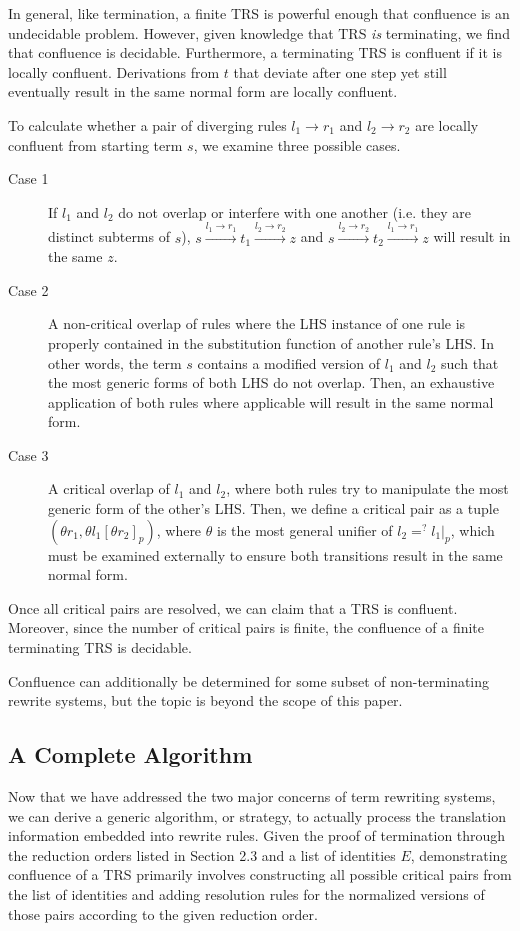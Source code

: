 \documentclass{article}
\begin{document}
In general, like termination, a finite TRS is powerful enough that confluence is an undecidable problem.
However, given knowledge that TRS \textit{is} terminating, we find that confluence is decidable.
Furthermore, a terminating TRS is confluent if it is locally confluent. Derivations from $t$
that deviate after one step yet still eventually result in the same normal form are locally confluent.

To calculate whether a pair of diverging rules $l_1 \rightarrow r_1$ and $l_2 \rightarrow r_2$ are locally confluent from starting term $s$, we examine three possible cases.
\begin{description}
    \item[Case 1] If $l_1$ and $l_2$ do not overlap or interfere with one another (i.e. they are distinct subterms of $s$),
    $s \xrightarrow{l_1 \rightarrow r_1} t_1 \xrightarrow{l_2 \rightarrow r_2} z$ and
    $s \xrightarrow{l_2 \rightarrow r_2} t_2 \xrightarrow{l_1 \rightarrow r_1} z$ will result in the same $z$.
    \item[Case 2] A non-critical overlap of rules where the LHS instance of one rule is properly contained in the substitution function of another rule's LHS.
    In other words, the term $s$ contains a modified version of $l_1$ and $l_2$ such that the most generic forms of both LHS do not overlap.
    Then, an exhaustive application of both rules where applicable will result in the same normal form.
    \item[Case 3] A critical overlap of $l_1$ and $l_2$, where both rules try to manipulate the most generic form of the other's LHS.
    Then, we define a critical pair as a tuple $(\theta r_1, \theta l_1[\theta r_2]_p)$, where $\theta$ is the most general unifier of $l_2 =^? l_1|_p$,
    which must be examined externally to ensure both transitions result in the same normal form.
\end{description}
Once all critical pairs are resolved, we can claim that a TRS is confluent.
Moreover, since the number of critical pairs is finite, the confluence of a finite terminating TRS is decidable.

Confluence can additionally be determined for some subset of non-terminating rewrite systems, but the topic is beyond the scope of this paper.

\subsection{A Complete Algorithm}
Now that we have addressed the two major concerns of term rewriting systems, we can derive a generic algorithm, or strategy,
to actually process the translation information embedded into rewrite rules. Given the proof of termination
through the reduction orders listed in Section 2.3 and a list of identities $E$, demonstrating confluence of a TRS primarily
involves constructing all possible critical pairs from the list of identities
and adding resolution rules for the normalized versions of those pairs according to the given reduction order.
\end{document}
